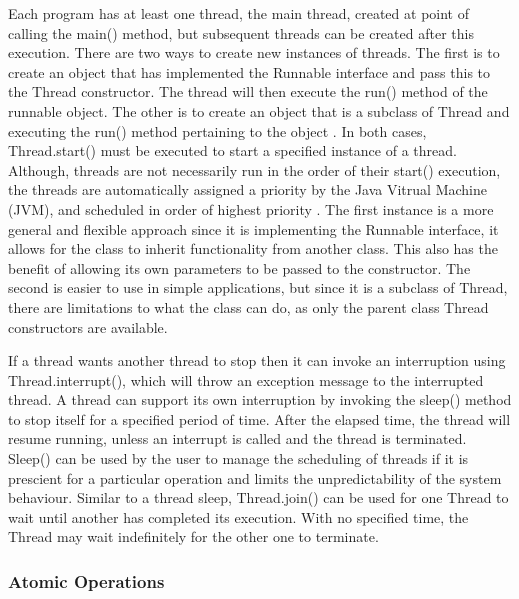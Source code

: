 \documentclass[a4paper,12pt]{article}
\begin{document}
Each program has at least one thread, the main thread, created at point of calling the main() method, but subsequent threads can be created after this execution. There are two ways to create new instances of threads. The first is to create an object that has implemented the Runnable interface and pass this to the Thread constructor. The thread will then execute the run() method of the runnable object. The other is to create an object that is a subclass of Thread and executing the run() method pertaining to the object \citep{oracle19}. In both cases, Thread.start() must be executed to start a specified instance of a thread. Although, threads are not necessarily run in the order of their start() execution, the threads are automatically assigned a priority by the Java Vitrual Machine (JVM), and scheduled in order of highest priority \citep{mois15}. The first instance is a more general and flexible approach since it is implementing the Runnable interface, it allows for the class to inherit functionality from another class. This also has the benefit of allowing its own parameters to be passed to the constructor. The second is easier to use in simple applications, but since it is a subclass of Thread, there are limitations to what the class can do, as only the parent class Thread constructors are available. 

If a thread wants another thread to stop then it can invoke an interruption using Thread.interrupt(), which will throw an exception message to the interrupted thread. A thread can support its own interruption by invoking the sleep() method to stop itself for a specified period of time. After the elapsed time, the thread will resume running, unless an interrupt is called and the thread is terminated. Sleep() can be used by the user to manage the scheduling of threads if it is prescient for a particular operation and limits the unpredictability of the system behaviour. Similar to a thread sleep, Thread.join() can be used for one Thread to wait until another has completed its execution. With no specified time, the Thread may wait indefinitely for the other one to terminate. 


\subsubsection{Atomic Operations}
\end{document}
